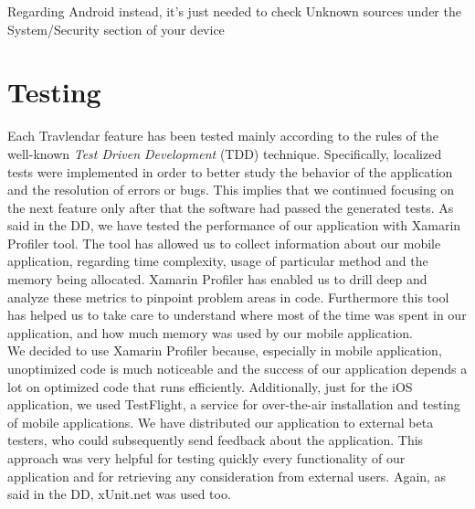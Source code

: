 Regarding Android instead, it's just needed to check Unknown sources under the System/Security section of your device\\

\section{Testing}
Each Travlendar feature has been tested mainly according to the rules of the well-known \textit{Test Driven Development} (TDD) technique. Specifically, localized tests were implemented in order to better study the behavior of the application and the resolution of errors or bugs. This implies that we continued focusing on the next feature only after that the software had passed the generated tests. As said in the DD, we have tested the performance of our application with Xamarin Profiler tool. The tool has allowed us to collect information about our mobile application, regarding time complexity, usage of particular method and the memory being allocated. Xamarin Profiler has enabled us to drill deep and analyze these metrics to pinpoint problem areas in code. Furthermore this tool has helped us to take care to understand where most of the time was spent in our application, and how much memory was used by our mobile application.\\

We decided to use Xamarin Profiler because, especially in mobile application, unoptimized code is much noticeable and the success of our application depends a lot on optimized code that runs efficiently. Additionally, just for the iOS application, we used TestFlight, a service for over-the-air installation and testing of mobile applications. We have distributed our application to external beta testers, who could subsequently send feedback about the application. This approach was very helpful for testing quickly every functionality of our application and for retrieving any consideration from external users. Again, as said in the DD, xUnit.net was used too.

